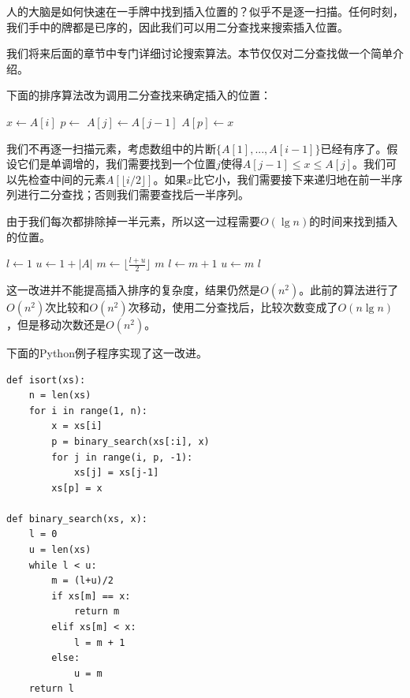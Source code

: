 \documentclass[UTF8]{article}
\begin{document}
人的大脑是如何快速在一手牌中找到插入位置的？似乎不是逐一扫描。任何时刻，我们手中的牌都是已序的，因此我们可以用二分查找来搜索插入位置。

我们将来后面的章节中专门详细讨论搜索算法。本节仅仅对二分查找做一个简单介绍。

下面的排序算法改为调用二分查找来确定插入的位置：

\begin{algorithmic}
    \State $x \gets A[i]$
    \State $p \gets $ 
      \State $A[j] \gets A[j-1]$
    \EndFor
    \State $A[p] \gets x$
  \EndFor
\EndFunction
\end{algorithmic}

我们不再逐一扫描元素，考虑数组中的片断$\{A[1], ..., A[i-1] \}$已经有序了。假设它们是单调增的，我们需要找到一个位置$j$使得$A[j-1] \leq x \leq A[j]$。我们可以先检查中间的元素$A[\lfloor i/2 \rfloor]$。如果$x$比它小，我们需要接下来递归地在前一半序列进行二分查找；否则我们需要查找后一半序列。

由于我们每次都排除掉一半元素，所以这一过程需要$O(\lg n)$的时间来找到插入的位置。

\begin{algorithmic}
  \State $l \gets 1$
  \State $u \gets 1+|A|$
    \State $m \gets \lfloor \frac{l+u}{2} \rfloor$
      \State \Return $m$ 
      \State $l \gets m+1$
    \Else
      \State $u \gets m$
    \EndIf
  \EndWhile
  \State \Return $l$
\EndFunction
\end{algorithmic}

这一改进并不能提高插入排序的复杂度，结果仍然是$O(n^2)$。此前的算法进行了$O(n^2)$次比较和$O(n^2)$次移动，使用二分查找后，比较次数变成了$O(n \lg n)$，但是移动次数还是$O(n^2)$。

下面的Python例子程序实现了这一改进。

\lstset{language=Python}
\begin{lstlisting}
def isort(xs):
    n = len(xs)
    for i in range(1, n):
        x = xs[i]
        p = binary_search(xs[:i], x)
        for j in range(i, p, -1):
            xs[j] = xs[j-1]
        xs[p] = x

def binary_search(xs, x):
    l = 0
    u = len(xs)
    while l < u:
        m = (l+u)/2
        if xs[m] == x:
            return m
        elif xs[m] < x:
            l = m + 1
        else:
            u = m
    return l
\end{lstlisting}
\end{document}
